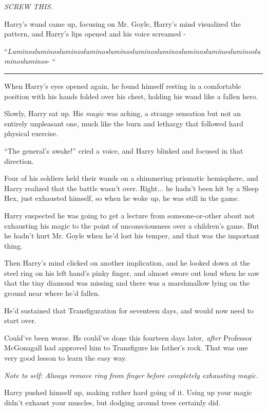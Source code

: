 \emph{SCREW THIS.}

Harry's wand came up, focusing on Mr. Goyle, Harry's mind visualized the
pattern, and Harry's lips opened and his voice screamed -

``\emph{Luminos}\emph{luminos}\emph{luminos}\emph{luminos}\emph{luminos}\emph{luminos}\emph{luminos}\emph{luminos}\emph{luminos}\emph{luminos}\emph{luminos}\emph{luminos}-
``

\begin{center}\rule{3in}{0.4pt}\end{center}

When Harry's eyes opened again, he found himself resting in a
comfortable position with his hands folded over his chest, holding his
wand like a fallen hero.

Slowly, Harry sat up. His \emph{magic} was aching, a strange sensation
but not an entirely unpleasant one, much like the burn and lethargy that
followed hard physical exercise.

``The general's awake!'' cried a voice, and Harry blinked and focused in
that direction.

Four of his soldiers held their wands on a shimmering prismatic
hemisphere, and Harry realized that the battle wasn't over.
Right... he hadn't been hit by a Sleep Hex, just exhausted himself,
so when he woke up, he was still in the game.

Harry suspected he was going to get a lecture from someone-or-other
about not exhausting his magic to the point of unconsciousness over a
children's game. But he hadn't hurt Mr. Goyle when he'd lost his temper,
and that was the important thing.

Then Harry's mind clicked on another implication, and he looked down at
the steel ring on his left hand's pinky finger, and almost swore out
loud when he saw that the tiny diamond was missing and there was a
marshmallow lying on the ground near where he'd fallen.

He'd sustained that Transfiguration for seventeen days, and would now
need to start over.

Could've been worse. He could've done this fourteen days later,
\emph{after} Professor McGonagall had approved him to Transfigure his
father's rock. That was one very good lesson to learn the easy way.

\emph{Note to self: Always remove ring from finger before completely
exhausting magic.}

Harry pushed himself up, making rather hard going of it. Using up your
magic didn't exhaust your muscles, but dodging around trees certainly
did.

